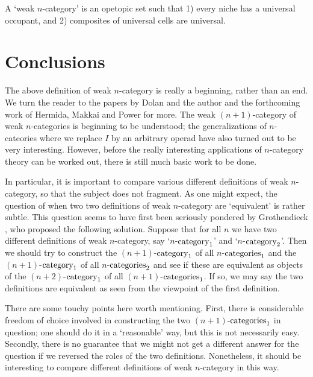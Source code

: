\begin{defn} \et A `weak $n$-category' is an opetopic
set such that 1) every niche has a universal occupant, and 2) composites
of universal cells are universal.  \end{defn}

\section{Conclusions}

The above definition of weak $n$-category is really a beginning, rather
than an end.  We turn the reader to the papers by Dolan and the author
\cite{BD2} and the forthcoming work of Hermida, Makkai and Power 
for more.  The weak $(n+1)$-category of weak $n$-categories is
beginning to be understood; the generalizations of $n$-cateories where
we replace $I$ by an arbitrary operad have also turned out to be very
interesting.   However, before the really interesting applications of
$n$-category theory can be worked out, there is still much basic work 
to be done.

In particular, it is important to compare various different definitions
of weak $n$-category, so that the subject does not fragment.  As one
might expect, the question of when two two definitions of weak
$n$-category are `equivalent' is rather subtle.  This question seems to
have first been seriously pondered by Grothendieck \cite{Gro}, who
proposed the following solution.  Suppose that for all $n$ we have two
different definitions of weak $n$-category, say `$n$-${\rm category}_1$'
and `$n$-${\rm category}_2$'.  Then we should try to construct the
$(n+1)$-${\rm category}_1$ of all $n$-${\rm categories}_1$ and the
$(n+1)$-${\rm category}_1$ of all $n$-${\rm categories}_2$ and see if
these are equivalent as objects of the $(n+2)$-${\rm category}_1$ of all
$(n+1)$-${\rm categories}_1$.  If so, we may say the two definitions are
equivalent as seen from the viewpoint of the first definition.

There are some touchy points here worth mentioning.  First, there is
considerable freedom of choice involved in constructing the two
$(n+1)$-${\rm categories}_1$ in question; one should do it in a
`reasonable' way, but this is not necessarily easy.  Secondly, there is
no guarantee that we might not get a different answer for the question
if we reversed the roles of the two definitions.  Nonetheless, it should
be interesting to compare different definitions of weak $n$-category in
this way.

